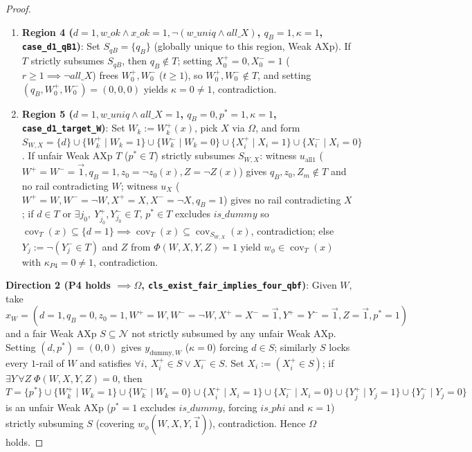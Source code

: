 \documentclass[11pt,a4paper]{article}
\newcommand{\N}{\mathcal{N}}
\newcommand{\cov}{\operatorname{cov}}
\newcommand{\code}[1]{\texttt{\small #1}}
\begin{document}
\begin{proof}
\begin{enumerate}
\[\begin{aligned}
      &\qquad\ X_{i\ne i_0}^+=X_{i\ne i_0}^-=1, Y^+=Y^-=\vec{1}, Z(x), p^*=1),\\
      u_{\mathrm{base},B} &= (d=1, q_B=0, z_0(x), W^+=\vec{0}, W^-=\vec{0}, X_{i_0}^+=0, X_{i\ne i_0}^+=1,\\
      &\qquad\ X^-=\vec{1}, Y^+=Y^-=\vec{1}, Z(x), p^*=1)
    \end{aligned}
  \]
  ($u_{\mathrm{base},B}$ uses $t \ge 1$ for $\neg w\_ok$). Splicing $u_{\mathrm{base},A}$'s remaining coordinates with $X^-=\vec{1}$ from $u_{\mathrm{base},B}$ gives $w_{\mathrm{hit}} \in \cov_T(x)$ with $\kappa=1$: setting $q_B=1$ if $q_B \notin T$ ($w\_ok \land x\_ok \land \neg all\_X$), or setting $X_{i_0}^+=1$ ($q_B=0$) if $X_{i_0}^+ \notin T$ ($w\_uniq \land all\_X$), contradiction.
  \item \textbf{Region 4 ($d=1, w\_ok \land x\_ok=1, \neg(w\_uniq \land all\_X)$, $q_B=1, \kappa=1$, \code{case\_d1\_qB1})}: Set $S_{qB}=\{q_B\}$ (globally unique to this region, Weak AXp). If $T$ strictly subsumes $S_{qB}$, then $q_B \notin T$; setting $X_0^+=0, X_0^-=1$ ($r \ge 1 \implies \neg all\_X$) frees $W_0^+, W_0^-$ ($t \ge 1$), so $W_0^+, W_0^- \notin T$, and setting $(q_B, W_0^+, W_0^-)=(0,0,0)$ yields $\kappa=0 \ne 1$, contradiction.
  \item \textbf{Region 5 ($d=1, w\_uniq \land all\_X=1$, $q_B=0, p^*=1, \kappa=1$, \code{case\_d1\_target\_W})}: Set $W_k:=W_k^+(x)$, pick $X$ via $\Omega$, and form $S_{W,X}=\{d\} \cup \{W_k^+ \mid W_k=1\} \cup \{W_k^- \mid W_k=0\} \cup \{X_i^+ \mid X_i=1\} \cup \{X_i^- \mid X_i=0\}$. If unfair Weak AXp $T$ ($p^* \in T$) strictly subsumes $S_{W,X}$: witness $u_{\mathrm{all1}}$ ($W^+=W^-=\vec{1}, q_B=1, z_0=\neg z_0(x), Z=\neg Z(x)$) gives $q_B, z_0, Z_m \notin T$ and no rail contradicting $W$; witness $u_X$ ($W^+=W, W^-=\neg W, X^+=X, X^-=\neg X, q_B=1$) gives no rail contradicting $X$; if $d \in T$ or $\exists j_0,\ Y_{j_0}^+, Y_{j_0}^- \in T$, $p^* \in T$ excludes $is\_dummy$ so $\cov_T(x) \subseteq \{d=1\} \implies \cov_T(x) \subseteq \cov_{S_{W,X}}(x)$, contradiction; else $Y_j := \neg(Y_j^- \in T)$ and $Z$ from $\Phi(W,X,Y,Z)=1$ yield $w_\phi \in \cov_T(x)$ with $\kappa_{P4}=0 \ne 1$, contradiction.
\end{enumerate}

\textbf{Direction 2 (P4 holds $\implies \Omega$, \code{cls\_exist\_fair\_implies\_four\_qbf})}: Given $W$, take $x_W=(d=1, q_B=0, z_0=1, W^+=W, W^-=\neg W, X^+=X^-=\vec{1}, Y^+=Y^-=\vec{1}, Z=\vec{1}, p^*=1)$ and a fair Weak AXp $S \subseteq \N$ not strictly subsumed by any unfair Weak AXp. Setting $(d, p^*)=(0,0)$ gives $y_{\mathrm{dummy},W}$ ($\kappa=0$) forcing $d \in S$; similarly $S$ locks every $1$-rail of $W$ and satisfies $\forall i,\ X_i^+ \in S \lor X_i^- \in S$. Set $X_i := (X_i^+ \in S)$; if $\exists Y\,\forall Z\;\Phi(W,X,Y,Z)=0$, then $T=\{p^*\} \cup \{W_k^+ \mid W_k=1\} \cup \{W_k^- \mid W_k=0\} \cup \{X_i^+ \mid X_i=1\} \cup \{X_i^- \mid X_i=0\} \cup \{Y_j^+ \mid Y_j=1\} \cup \{Y_j^- \mid Y_j=0\}$ is an unfair Weak AXp ($p^*=1$ excludes $is\_dummy$, forcing $is\_phi$ and $\kappa=1$) strictly subsuming $S$ (covering $w_\phi(W,X,Y,\vec{1})$), contradiction. Hence $\Omega$ holds.
\end{proof}
\end{document}
